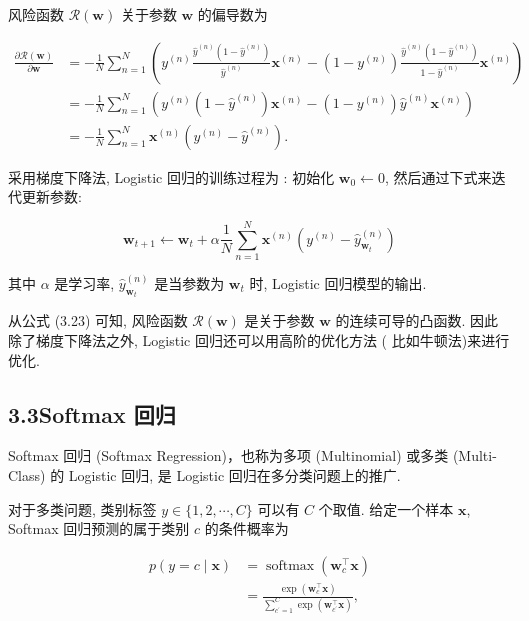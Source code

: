 \documentclass[10pt]{article}
\begin{document}
风险函数 $\mathcal{R}(\boldsymbol{w})$ 关于参数 $\boldsymbol{w}$ 的偏导数为


\begin{align*}
\frac{\partial \mathcal{R}(\boldsymbol{w})}{\partial \boldsymbol{w}} & =-\frac{1}{N} \sum_{n=1}^{N}\left(y^{(n)} \frac{\hat{y}^{(n)}\left(1-\hat{y}^{(n)}\right)}{\hat{y}^{(n)}} \boldsymbol{x}^{(n)}-\left(1-y^{(n)}\right) \frac{\hat{y}^{(n)}\left(1-\hat{y}^{(n)}\right)}{1-\hat{y}^{(n)}} \boldsymbol{x}^{(n)}\right)  \tag{3.24}\\
& =-\frac{1}{N} \sum_{n=1}^{N}\left(y^{(n)}\left(1-\hat{y}^{(n)}\right) \boldsymbol{x}^{(n)}-\left(1-y^{(n)}\right) \hat{y}^{(n)} \boldsymbol{x}^{(n)}\right)  \tag{3.25}\\
& =-\frac{1}{N} \sum_{n=1}^{N} \boldsymbol{x}^{(n)}\left(y^{(n)}-\hat{y}^{(n)}\right) . \tag{3.26}
\end{align*}


采用梯度下降法, Logistic 回归的训练过程为 : 初始化 $\boldsymbol{w}_{0} \leftarrow 0$, 然后通过下式来迭代更新参数:


\begin{equation*}
\boldsymbol{w}_{t+1} \leftarrow \boldsymbol{w}_{t}+\alpha \frac{1}{N} \sum_{n=1}^{N} \boldsymbol{x}^{(n)}\left(y^{(n)}-\hat{y}_{\boldsymbol{w}_{t}}^{(n)}\right) \tag{3.27}
\end{equation*}


其中 $\alpha$ 是学习率, $\hat{y}_{\boldsymbol{w}_{t}}^{(n)}$ 是当参数为 $\boldsymbol{w}_{t}$ 时, Logistic 回归模型的输出.

从公式 (3.23) 可知, 风险函数 $\mathcal{R}(\boldsymbol{w})$ 是关于参数 $\boldsymbol{w}$ 的连续可导的凸函数. 因此除了梯度下降法之外, Logistic 回归还可以用高阶的优化方法 ( 比如牛顿法)来进行优化.

\subsection*{3.3Softmax 回归}
Softmax 回归 (Softmax Regression)，也称为多项 (Multinomial) 或多类 (Multi-Class) 的 Logistic 回归, 是 Logistic 回归在多分类问题上的推广.

对于多类问题, 类别标签 $y \in\{1,2, \cdots, C\}$ 可以有 $C$ 个取值. 给定一个样本 $\boldsymbol{x}$, Softmax 回归预测的属于类别 $c$ 的条件概率为


\begin{align*}
p(y=c \mid \boldsymbol{x}) & =\operatorname{softmax}\left(\boldsymbol{w}_{c}^{\top} \boldsymbol{x}\right)  \tag{3.28}\\
& =\frac{\exp \left(\boldsymbol{w}_{c}^{\top} \boldsymbol{x}\right)}{\sum_{c^{\prime}=1}^{C} \exp \left(\boldsymbol{w}_{c^{\prime}}^{\top} \boldsymbol{x}\right)}, \tag{3.29}
\end{align*}
\end{document}
